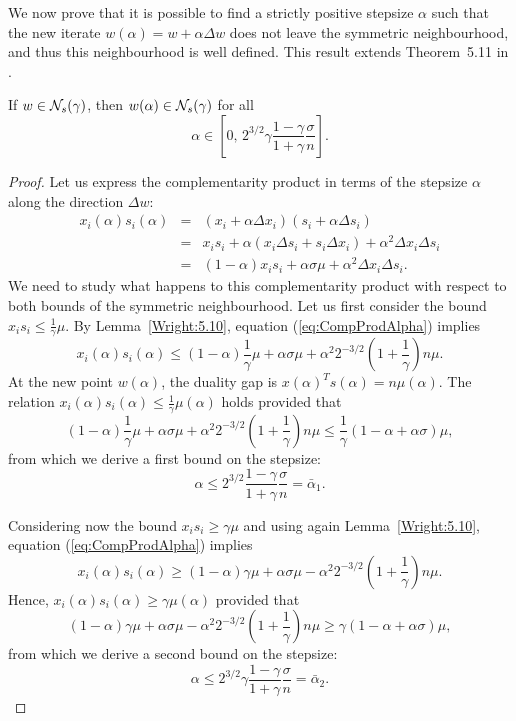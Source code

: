 We now prove that it is possible to find a strictly positive stepsize 
$\alpha$ such that the new iterate 
$w(\alpha) = w + \alpha\Delta w$
does not leave the symmetric neighbourhood, and thus this 
neighbourhood is well defined. This result extends 
Theorem~5.11 in \cite{ipm:Wright97}.

\begin{theorem} \label{th:SymNeighbourhood}
If $w \in \mathcal{N}_s(\gamma)$, then $w(\alpha) \in \mathcal{N}_s(\gamma)$ for all
\[
  \alpha \in \left[0, \, 2^{3/2}\gamma\frac{1-\gamma}{1+\gamma}
                                      \frac{\sigma}{n} \right].
\]
\end{theorem}
%
\begin{proof}
Let us express the complementarity product in terms of the stepsize 
$\alpha$ along the direction $\Delta w$:
%
\begin{eqnarray} \label{eq:CompProdAlpha}
x_i(\alpha)s_i(\alpha)&=&(x_i+\alpha\Delta x_i)(s_i+\alpha\Delta s_i)\nonumber\\ 
&=& x_is_i+\alpha(x_i\Delta s_i +s_i\Delta x_i) +\alpha^2\Delta x_i\Delta s_i\\
&=& (1-\alpha)x_is_i + \alpha\sigma\mu + \alpha^2\Delta x_i\Delta s_i.\nonumber
\end{eqnarray}
%
We need to study what happens to this complementarity product 
with respect to both bounds of the symmetric neighbourhood.
Let us first consider the bound $x_is_i\le \frac{1}{\gamma}\mu$.
By Lemma~\ref{Wright:5.10}, equation (\ref{eq:CompProdAlpha}) implies
\[
x_i(\alpha)s_i(\alpha) \le (1-\alpha)\frac{1}{\gamma}\mu +\alpha\sigma\mu 
+ \alpha^2 2^{-3/2}\left( 1+ \frac{1}{\gamma} \right)n\mu.
\]
At the new point $w(\alpha)$, the duality gap
is $x(\alpha)^Ts(\alpha) = n\mu(\alpha)$.
The relation $x_i(\alpha)s_i(\alpha)\le \frac{1}{\gamma}\mu(\alpha)$ 
holds provided that
\[
(1-\alpha)\frac{1}{\gamma}\mu +\alpha\sigma\mu + \alpha^2 2^{-3/2}\left( 1+ \frac{1}{\gamma} \right)n\mu 
\le\frac{1}{\gamma}(1-\alpha+\alpha\sigma)\mu,
\]
from which we derive a first bound on the stepsize:
\[
\alpha \le 2^{3/2}\frac{1-\gamma}{1+\gamma}\frac{\sigma}{n} = \bar\alpha_1.
\]

Considering now the bound $x_is_i\ge \gamma\mu$ and using again
Lemma~\ref{Wright:5.10}, equation (\ref{eq:CompProdAlpha}) implies
\[
x_i(\alpha)s_i(\alpha) \ge (1-\alpha)\gamma\mu + \alpha\sigma\mu 
- \alpha^2 2^{-3/2}\left( 1+ \frac{1}{\gamma} \right)n\mu.
\]
Hence, $x_i(\alpha)s_i(\alpha)\ge \gamma\mu(\alpha)$ provided that
\[
(1-\alpha)\gamma\mu + \alpha\sigma\mu- \alpha^2 2^{-3/2}\left( 1+ \frac{1}{\gamma} \right)n\mu 
\ge\gamma(1-\alpha+\alpha\sigma)\mu,
\]
from which we derive a second bound on the stepsize:
\[
\alpha\le 2^{3/2}\gamma\frac{1-\gamma}{1+\gamma}\frac{\sigma}{n} =\bar\alpha_2.
\]


\end{proof}
